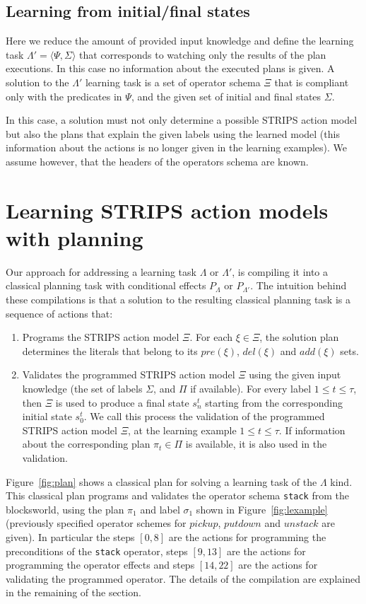 \documentclass[letterpaper]{article} %
\newcommand{\tup}[1]{{\langle #1 \rangle}}
\begin{document}
\subsection{Learning from initial/final states}
Here we reduce the amount of provided input knowledge and define the learning task $\Lambda'=\tup{\Psi,\Sigma}$ that corresponds to watching only the results of the plan executions. In this case no information about the executed plans is given. A solution to the $\Lambda'$ learning task is a set of operator schema $\Xi$ that is compliant only with the predicates in $\Psi$, and the given set of initial and final states $\Sigma$.

In this case, a solution must not only determine a possible STRIPS action model but also the plans that explain the given labels using the learned model (this information about the actions is no longer given in the learning examples). We assume however, that the headers of the operators schema are known. 


\section{Learning STRIPS action models with planning}
Our approach for addressing a learning task $\Lambda$ or $\Lambda'$, is compiling it into a classical planning task with conditional effects $P_{\Lambda}$ or $P_{\Lambda'}$. The intuition behind these compilations is that a solution to the resulting classical planning task is a sequence of actions that:
\begin{enumerate}
\item Programs the STRIPS action model $\Xi$. For each $\xi\in\Xi$, the solution plan determines the literals that belong to its $pre(\xi)$, $del(\xi)$ and $add(\xi)$ sets.
\item Validates the programmed STRIPS action model $\Xi$ using the given input knowledge (the set of labels $\Sigma$, and $\Pi$ if available).  For every label {\small $1\leq t\leq \tau$}, then $\Xi$ is used to produce a final state $s_{n}^t$ starting from the corresponding initial state $s_0^t$. We call this process the validation of the programmed STRIPS action model $\Xi$, at the learning example {\small $1\leq t\leq \tau$}. If information about the corresponding plan $\pi_t\in \Pi$ is available, it is also used in the validation.
\end{enumerate}

Figure~\ref{fig:plan} shows a classical plan for solving a learning task of the $\Lambda$ kind. This classical plan programs and validates the operator schema {\tt\small stack} from the blocksworld, using the plan $\pi_1$ and label $\sigma_1$ shown in Figure~\ref{fig:lexample} (previously specified operator schemes for $pickup$, $putdown$ and $unstack$ are given). In particular the steps $[0,8]$ are the actions for programming the preconditions of the {\tt\small stack} operator, steps $[9,13]$ are the actions for programming the operator effects and steps $[14,22]$ are the actions for validating the programmed operator. The details of the compilation are explained in the remaining of the section.
\end{document}
